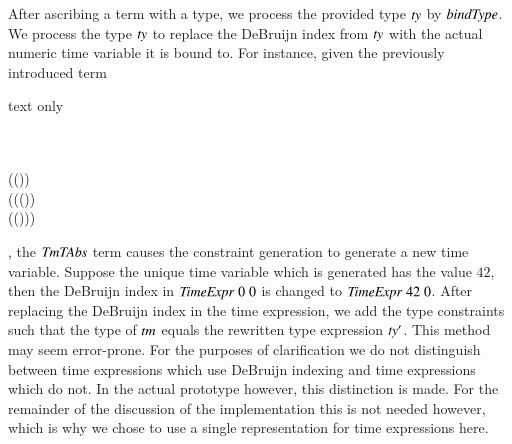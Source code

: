 After ascribing a term with a type, we process the provided type \ensuremath{\Varid{ty}} by \ensuremath{\Varid{bindType}}.
We process the type \ensuremath{\Varid{ty}} to replace the DeBruijn index from \ensuremath{\Varid{ty}} with the actual numeric time variable it is bound to.
For instance, given the previously introduced term
\begin{changemargin}{1cm}{0cm}
\begin{expansionno}{text only}
\begin{hscode}\SaveRestoreHook
{}%
%
%
%
%
%
%
%
\>[B]{}\;\<[13]%
\>[13]{}\mathbin{\$}{}\<[13E]%
\\
\>[B]{}\<[3]%
\>[3]{}\;{}\<[9]%
\>[9]{}\<[13]%
\>[13]{}\mathbin{\$}{}\<[13E]%
\\
\>[9]{}\;{}\<[16]%
\>[16]{}(\;\;(\;\;))\;{}\<[E]%
\\
\>[16]{}(\;{}\<[24]%
\>[24]{}(\;\;(\;\;))\;{}\<[E]%
\\
\>[24]{}(\;\;(\;\;))){}\<[E]%
\ColumnHook
\end{hscode}\resethooks
\end{expansionno}
\end{changemargin}
, the \ensuremath{\Conid{TmTAbs}} term causes the constraint generation to generate a new time variable.
Suppose the unique time variable which is generated has the value \ensuremath{\mathrm{42}}, then the DeBruijn index in \ensuremath{\Conid{TimeExpr}\;\mathrm{0}\;\mathrm{0}} is changed to \ensuremath{\Conid{TimeExpr}\;\mathrm{42}\;\mathrm{0}}.
After replacing the DeBruijn index in the time expression, we add the type constraints such that the type of \ensuremath{\Varid{tm}} equals the rewritten type expression \ensuremath{\Varid{ty'}}.
This method may seem error-prone.
For the purposes of clarification we do not distinguish between time expressions which use DeBruijn indexing and time expressions which do not.
In the actual prototype however, this distinction is made.
For the remainder of the discussion of the implementation this is not needed however, which is why we chose to use a single representation for time expressions here.

